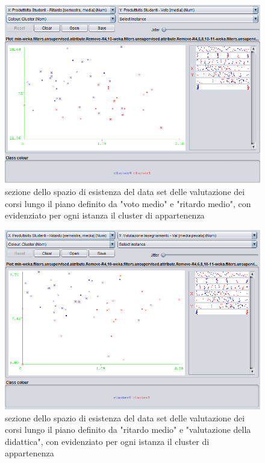         \begin{figure}
            \centering
            \caption{sezione dello spazio di esistenza del data set delle valutazione dei corsi lungo il piano definito da "voto medio" e "ritardo medio", con evidenziato per ogni istanza il cluster di appartenenza}
            \label{1}
            \includegraphics[scale=0.5]{../cluster/min_kmeans_2cl_attr1.png}
        \end{figure}

        \begin{figure}
            \centering
            \caption{sezione dello spazio di esistenza del data set delle valutazione dei corsi lungo il piano definito da "ritardo medio" e "valutazione della didattica", con evidenziato per ogni istanza il cluster di appartenenza}
            \label{2}
            \includegraphics[scale=0.5]{../cluster/min_kmeans_2cl_attr2.png}
        \end{figure}

